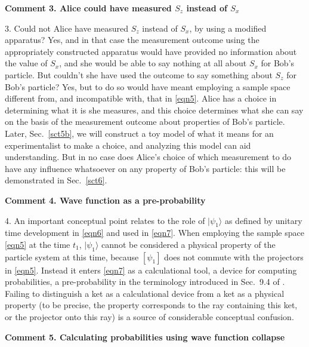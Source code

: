\documentclass[10pt]{article} %
\def\outl#1{\par{\medskip\noindent\hspace*{.5cm}\bf
      \mathversion{bold}#1\mathversion{normal}\smallskip} }
\def\np{} \def\xa{} \def\xb{} \def\xn{} \def\xp{}
\def\outl#1{} \def\np{} \def\xa{} \def\xb{} \def\xn{} \def\xp{}
\def\outl#1{\par{\medskip\noindent\hspace*{.5cm}\bf
      \mathversion{bold}#1\mathversion{normal}\smallskip} }
\def\np{\newpage }\def\xn{\nopagebreak }\def\xp{\pagebreak }
\newcommand{\ket}[1]{|#1\rgl }
\newcommand{\rgl}{\rangle }
\begin{document}
\xb
\outl{Comment 3.  Alice could have measured $S_z$ instead of $S_x$}
\xa




3. Could not Alice have measured $S_z$ instead of $S_x$, by using a modified
apparatus?  Yes, and in that case the measurement outcome using the
appropriately constructed apparatus would have provided no information about
the value of $S_x$, and she would be able to say nothing at all about $S_x$
for Bob's particle.  But couldn't she have used the outcome to say something
about $S_z$ for Bob's particle?  Yes, but to do so would have meant employing
a sample space different from, and incompatible with, that in \eqref{eqn5}.
Alice has a choice in determining what it is she measures, and this choice
determines what she can say on the basis of the measurement outcome about
properties of Bob's particle.  Later, Sec.~\ref{sct5b}, we will construct a
toy model of what it means for an experimentalist to make a choice, and
analyzing this model can aid understanding.  But in no case does Alice's
choice of which measurement to do have any influence whatsoever on any
property of Bob's particle: this will be demonstrated in Sec.~\ref{sct6}.

\xb
\outl{Comment 4. Wave function as a pre-probability}
\xa



4. An important conceptual point relates to the role of $\ket{\psi_1}$ as
defined by unitary time development in \eqref{eqn6} and used in \eqref{eqn7}.
When employing the sample space \eqref{eqn5} at the time $t_1$, $\ket{\psi_1}$
cannot be considered a physical property of the particle system at this time,
because $[\psi_1]$ does not commute with the projectors in \eqref{eqn5}.
Instead it enters \eqref{eqn7} as a calculational tool, a device for computing
probabilities, a pre-probability in the terminology introduced in Sec.~9.4 of
\cite{Grff02c}.  Failing to distinguish a ket as a calculational device from a
ket as a physical property (to be precise, the property corresponds to the ray
containing this ket, or the projector onto this ray) is a source of
considerable conceptual confusion.

\xb
\outl{Comment 5. Calculating probabilities using wave function collapse}
\xa
\end{document}
